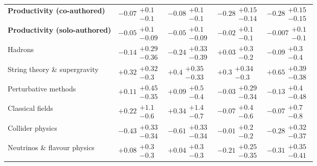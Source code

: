 \begin{table}[H]
\begin{tabular}{lllll}
\textbf{Productivity (co-authored)} & $-0.07\substack{+0.1 \\ -0.1}$ & $-0.08\substack{+0.1 \\ -0.1}$ & $\bm{-0.28}\substack{+0.15 \\ -0.14}$ & $\bm{-0.28}\substack{+0.15 \\ -0.15}$ \\
\textbf{Productivity (solo-authored)} & $-0.05\substack{+0.1 \\ -0.09}$ & $-0.05\substack{+0.1 \\ -0.09}$ & $-0.02\substack{+0.1 \\ -0.1}$ & $-0.007\substack{+0.1 \\ -0.1}$ \\
\hline Hadrons & $-0.14\substack{+0.29 \\ -0.36}$ & $-0.24\substack{+0.33 \\ -0.39}$ & $+0.03\substack{+0.3 \\ -0.2}$ & $-0.09\substack{+0.3 \\ -0.4}$ \\
String theory \& supergravity & $\bm{+0.32}\substack{+0.32 \\ -0.3}$ & $\bm{+0.4}\substack{+0.35 \\ -0.33}$ & $\bm{+0.3}\substack{+0.34 \\ -0.3}$ & $\bm{+0.65}\substack{+0.39 \\ -0.38}$ \\
Perturbative methods & $+0.11\substack{+0.45 \\ -0.35}$ & $+0.09\substack{+0.5 \\ -0.4}$ & $-0.03\substack{+0.29 \\ -0.34}$ & $-0.13\substack{+0.4 \\ -0.48}$ \\
Classical fields & $+0.22\substack{+1.1 \\ -0.6}$ & $+0.34\substack{+1.4 \\ -0.7}$ & $-0.07\substack{+0.4 \\ -0.6}$ & $-0.07\substack{+0.7 \\ -0.8}$ \\
Collider physics & $\bm{-0.43}\substack{+0.33 \\ -0.34}$ & $\bm{-0.61}\substack{+0.33 \\ -0.34}$ & $-0.01\substack{+0.2 \\ -0.2}$ & $-0.28\substack{+0.32 \\ -0.37}$ \\
Neutrinos \& flavour physics & $+0.08\substack{+0.3 \\ -0.3}$ & $+0.04\substack{+0.3 \\ -0.3}$ & $-0.21\substack{+0.25 \\ -0.35}$ & $-0.31\substack{+0.35 \\ -0.41}$ \\

\end{tabular}
\end{table}
